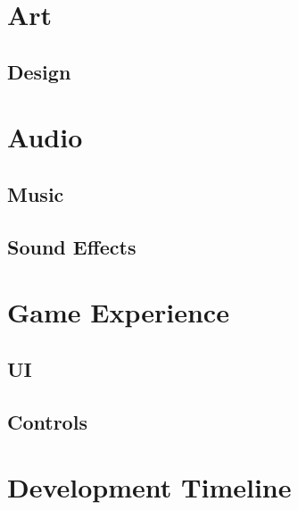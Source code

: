 \documentclass[a4paper,12pt]{article}
\begin{document}
  \section{Art}
  \subsection{Design}
  \section{Audio}
  \subsection{Music}
  \subsection{Sound Effects}
  \section{Game Experience}
  \subsection{UI}
  \subsection{Controls}
  \section{Development Timeline}
\end{document}
